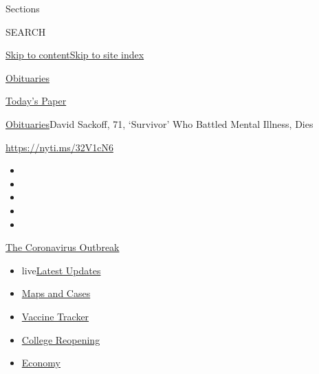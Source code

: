 Sections

SEARCH

\protect\hyperlink{site-content}{Skip to
content}\protect\hyperlink{site-index}{Skip to site index}

\href{https://www.nytimes.com/section/obituaries}{Obituaries}

\href{https://myaccount.nytimes.com/auth/login?response_type=cookie\&client_id=vi}{}

\href{https://www.nytimes.com/section/todayspaper}{Today's Paper}

\href{/section/obituaries}{Obituaries}\textbar{}David Sackoff, 71,
`Survivor' Who Battled Mental Illness, Dies

\url{https://nyti.ms/32V1cN6}

\begin{itemize}
\item
\item
\item
\item
\item
\end{itemize}

\href{https://www.nytimes.com/news-event/coronavirus?action=click\&pgtype=Article\&state=default\&region=TOP_BANNER\&context=storylines_menu}{The
Coronavirus Outbreak}

\begin{itemize}
\tightlist
\item
  live\href{https://www.nytimes.com/2020/08/03/world/coronavirus-covid-19.html?action=click\&pgtype=Article\&state=default\&region=TOP_BANNER\&context=storylines_menu}{Latest
  Updates}
\item
  \href{https://www.nytimes.com/interactive/2020/us/coronavirus-us-cases.html?action=click\&pgtype=Article\&state=default\&region=TOP_BANNER\&context=storylines_menu}{Maps
  and Cases}
\item
  \href{https://www.nytimes.com/interactive/2020/science/coronavirus-vaccine-tracker.html?action=click\&pgtype=Article\&state=default\&region=TOP_BANNER\&context=storylines_menu}{Vaccine
  Tracker}
\item
  \href{https://www.nytimes.com/2020/08/02/us/covid-college-reopening.html?action=click\&pgtype=Article\&state=default\&region=TOP_BANNER\&context=storylines_menu}{College
  Reopening}
\item
  \href{https://www.nytimes.com/live/2020/08/03/business/stock-market-today-coronavirus?action=click\&pgtype=Article\&state=default\&region=TOP_BANNER\&context=storylines_menu}{Economy}
\end{itemize}

